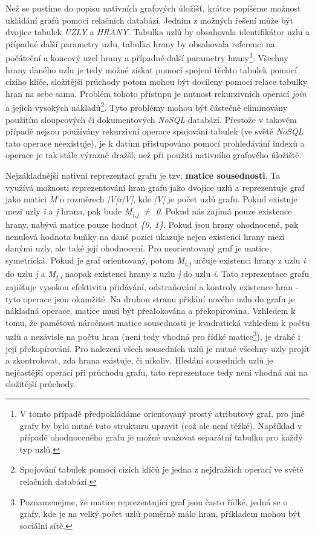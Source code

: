 Než se pustíme do popisu nativních grafových úložišť, krátce popíšeme možnost ukládání grafů pomocí relačních databází. Jedním z možných řešení může být dvojice tabulek \textit{UZLY} a \textit{HRANY}. Tabulka uzlů by obsahovala identifikátor uzlu a případné další parametry uzlu, tabulka hrany by obsahovala referenci na počáteční a koncový uzel hrany a případné další parametry hrany\footnote{V tomto případě předpokládáme orientovaný prostý atributový graf, pro jiné grafy by bylo nutné tuto strukturu upravit (což ale není těžké). Například v případě ohodnoceného grafu je možné uvažovat separátní tabulku pro každý typ uzlů.}. Všechny hrany daného uzlu je tedy možné získat pomocí spojení těchto tabulek pomocí cízího klíče, složitější průchody potom mohou být docíleny pomocí relace tabulky hran na sebe sama. Problém tohoto přístupu je nutnost rekurzivních operací \textit{join} a jejich vysokých nákladů\footnote{Spojování tabulek pomocí cizích klíčů je jedna z nejdražších operací ve světě relačních databází.}. Tyto problémy mohou být částečně eliminovány použitím sloupcových či dokumentových \textit{NoSQL} databází. Přestože v takovém případě nejsou používány rekurzivní operace spojování tabulek (ve světě \textit{NoSQL} tato operace neexistuje), je k datům přistupováno pomocí prohledávání indexů a operace je tak stále výrazně dražší, než při použití nativního grafového úložiště.\cite{Lal15}

Nejzákladnější nativní reprezentací grafu je tzv. \textbf{matice sousednosti}. Ta využívá možnosti reprezentování hran grafu jako dvojice uzlů a reprezentuje graf jako matici \textit{M} o rozměrech \textit{|V|x|V|}, kde \textit{|V|} je počet uzlů grafu. Pokud existuje mezi uzly \textit{i} a \textit{j} hrana, pak bude \textit{M\textsubscript{i,j} $\neq$ 0}.
Pokud nás zajímá pouze existence hrany, nabývá matice pouze hodnot \textit{\{0, 1\}}. Pokud jsou hrany ohodnocené, pak nenulová hodnota buňky na dané pozici ukazuje nejen existenci hrany mezi danými uzly, ale také její ohodnocení. Pro neorientovaný graf je matice symetrická. Pokud je graf orientovaný, potom \textit{M\textsubscript{i,j}} určuje existenci hrany z uzlu \textit{i} do uzlu \textit{j} a \textit{M\textsubscript{j,i}} naopak existenci hrany z uzlu \textit{j} do uzlu \textit{i}.
Tato reprezentace grafu zajišťuje vysokou efektivitu přidávání, odstraňování a kontroly existence hran - tyto operace jsou okamžité.  Na druhou stranu přidání nového uzlu do grafu je nákladná operace, matice musí být přealokována a překopírována. Vzhledem k tomu, že paměťová náročnost matice sousednosti je kvadratická vzhledem k počtu uzlů a nezávisle na počtu hran (není tedy vhodná pro řídké matice\footnote{Poznamenejme, že matice reprezentující graf jsou často řídké, jedná se o grafy, kde je na velký počet uzlů poměrně málo hran, příkladem mohou být sociální sítě.}), je drahé i její překopírování.
Pro nalezení všech sousedních uzlů je nutné všechny uzly projít a zkontrolovat, zda hrana existuje, či nikoliv. Hledání sousedních uzlů je nejčastější operací při průchodu grafu, tato reprezentace tedy není vhodná ani na složitější průchody.

